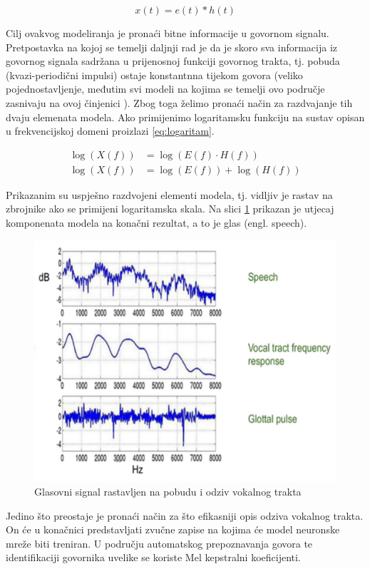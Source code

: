 \begin{equation}
    x(t) = e(t) \ast h(t)
    \label{eq:govor_vremenska}
\end{equation}

Cilj ovakvog modeliranja je pronaći bitne informacije u govornom signalu. Pretpostavka na
kojoj se temelji daljnji rad je da je skoro sva informacija iz govornog signala sadržana
u prijenosnoj funkciji govornog trakta, tj. pobuda (kvazi-periodični impulsi) ostaje
konstantnna tijekom govora (veliko pojednostavljenje, međutim svi modeli na kojima
se temelji ovo područje zasnivaju na ovoj činjenici \cite{multiplier, emotion, sidhu2024mfcc}).
Zbog toga želimo pronaći način za 
razdvajanje tih dvaju elemenata modela. Ako primijenimo logaritamsku funkciju na
sustav opisan u frekvencijskoj domeni proizlazi \ref{eq:logaritam}.

\begin{equation}
    \label{eq:logaritam}
    \begin{aligned}
        \log(X(f)) &= \log(E(f) \cdot H(f)) \\
        \log(X(f)) &= \log(E(f)) + \log(H(f))
    \end{aligned}
\end{equation}

Prikazanim su uspješno razdvojeni elementi modela, tj. vidljiv je rastav na zbrojnike
ako se primijeni logaritamska skala. Na slici \ref{pic:rastav} prikazan je utjecaj
komponenata modela na konačni rezultat, a to je glas (engl. speech). 

\begin{figure}[htb]
    \centering
    \includegraphics[width=0.6\linewidth]{Chapters/struktura_sustava/generiranje_znacajki/log.png} 
    \caption{Glasovni signal rastavljen na pobudu i odziv vokalnog trakta \cite{sidhu2024mfcc}}
    \label{pic:rastav}
\end{figure}

Jedino što preostaje je pronaći način za što efikasniji opis odziva vokalnog trakta. On će
u konačnici predstavljati zvučne zapise na kojima će model neuronske mreže biti treniran.
U području automatskog prepoznavanja govora te identifikaciji govornika uvelike se koriste
Mel kepstralni koeficijenti.


